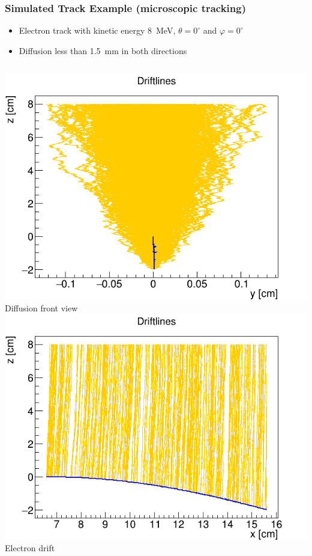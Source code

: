 \documentclass{beamer}
\begin{document}
	\begin{frame}
		\frametitle{Simulated Track Example (microscopic tracking)}
		\begin{itemize}
			\item Electron track with kinetic energy 8~MeV, $\theta = 0^\circ$ and $\varphi = 0^\circ$
			\item Diffusion less than 1.5~mm in both directions
		\end{itemize}
		\vspace{0.5cm}
		\begin{columns}
				\centering
				\includegraphics[width = 0.95 \linewidth]{../images/drift_yz.png}
				Diffusion front view
				\centering
				\includegraphics[width = 0.95 \linewidth]{../images/drift_xz.png}
				Electron drift

\end{columns}
\end{frame}
\end{document}
